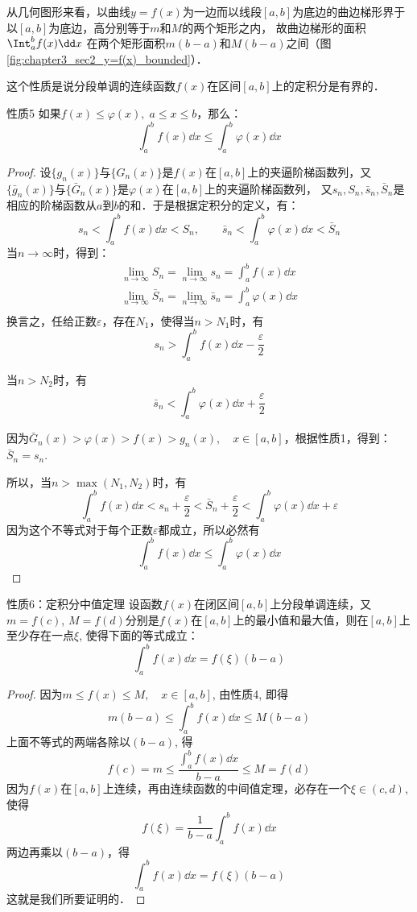 从几何图形来看，以曲线$y=f(x)$为一边而以线段$[a,b]$为底边的曲边梯形界于以$[a,b]$为底边，高分别等于$m$和$M$的两个矩形之内，
故曲边梯形的面积$\Int^b_a f(x)\dd x$
在两个矩形面积$m(b-a)$和$M(b-a)$之间（图\ref{fig:chapter3_sec2_y=f(x)_bounded}）．

这个性质是说分段单调的连续函数$f(x)$在区间$[a,b]$上的定积分是有界的．

\begin{blk}{性质5}
如果$f(x)\le \varphi(x),\; a\le x\le b$，那么：
\[\int^b_a f(x)\dd x\le \int^b_a \varphi(x)\dd x\]
\end{blk}

\begin{proof}
    设$\{g_n(x)\}$与$\{G_n(x)\}$是$f(x)$在$[a,b]$上的夹逼阶梯函数列，又$\{\bar g_n(x)\}$与$\{\bar G_n(x)\}$是$\varphi(x)$在$[a,b]$上的夹逼阶梯函数列，
又$s_n, S_n, \bar s_n, \bar S_n$是相应的阶梯函数从$a$到$b$的和．于是根据定积分的定义，有：
\[s_n<\int^b_a f(x)\dd x<S_n,\qquad \bar s_n<\int^b_a \varphi(x)\dd x<\bar S_n\]
当$n\to\infty$时，得到：
\begin{align*}
\lim_{n\to\infty}S_n =\lim_{n\to\infty}s_n =\int^b_a f(x)\dd x\\
\lim_{n\to\infty}\bar S_n =\lim_{n\to\infty}\bar s_n =\int^b_a \varphi(x)\dd x\\
\end{align*}
换言之，任给正数$\varepsilon$，存在$N_1$，使得当$n>N_1$时，有
\[s_n>\int^b_a f(x)\dd x-\frac{\varepsilon}{2}\]

当$n>N_2$时，有
\[\bar s_n<\int^b_a \varphi(x)\dd x+\frac{\varepsilon}{2}\]

因为$\bar G_n(x)>\varphi(x)>f(x)>g_n(x),\quad x\in[a,b]$，根据性质1，得到：$\bar S_n=s_n$.

所以，当$n>\max(N_1,N_2)$时，有
\[\int^b_a f(x)\dd x<s_n+\frac{\varepsilon}{2}<\bar S_n+\frac{\varepsilon}{2}<\int^b_a \varphi(x)\dd x+\varepsilon\]
因为这个不等式对于每个正数$\varepsilon$都成立，所以必然有
\[\int^b_a f(x)\dd x\le \int^b_a \varphi(x)\dd x\]
\end{proof}

\begin{blk}{性质6：定积分中值定理}
   设函数$f(x)$在闭区间$[a,b]$上分段单调连续，又
$m=f(c)$, $M=f(d)$分别是$f(x)$在$[a,b]$上的最小值和最大值，则在$[a,b]$上至少存在一点$\xi$, 使得下面的等式成立：
\[\int^b_a f (x) \dd x=f(\xi) (b-a)\] 
\end{blk}

\begin{proof}
    因为$m\le f (x) \le M,\quad x\in [a,b]$, 
由性质4, 即得
\[m (b-a)\le \int^b_a f (x) \dd x\le M(b-a)\]
上面不等式的两端各除以$(b-a)$, 得
\[f(c)=m\le \frac{\int^b_a f (x) \dd x}{b-a}\le M=f(d)\]
因为$f(x)$在$[a,b]$上连续，再由连续函数的中间值定理，必存在一个$\xi\in(c,d)$, 使得
\[f(\xi)=\frac{1}{b-a}\int^b_a f (x) \dd x\]
两边再乘以$(b-a)$，得
\[\int^b_a f (x) \dd x=f(\xi)(b-a)\]
这就是我们所要证明的．
\end{proof}

